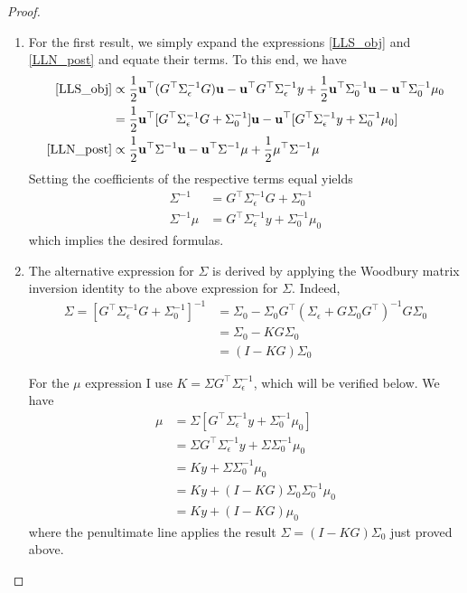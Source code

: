\documentclass[12pt]{article}
\newcommand{\bpar}{\mathbf{u}} %
\begin{document}
\begin{proof} 
\begin{enumerate}
\item For the first result, we simply expand the expressions \ref{LLS_obj} and \ref{LLN_post} and equate their terms. To this end, we have
\begin{align*}
\ref{LLS_obj} &\propto \frac{1}{2} \bpar^\top (G^\top \Sigma^{-1}_\epsilon G) \bpar - \bpar^\top G^\top \Sigma_\epsilon^{-1} y + \frac{1}{2} \bpar^\top \Sigma_0^{-1} \bpar - \bpar^\top \Sigma_0^{-1} \mu_0 \\
	             &= \frac{1}{2} \bpar^\top [G^\top \Sigma_\epsilon^{-1} G + \Sigma_0^{-1}]\bpar - \bpar^\top [G^\top \Sigma_{\epsilon}^{-1}y + \Sigma_0^{-1}\mu_0] \\
\ref{LLN_post} &\propto \frac{1}{2} \bpar^\top \Sigma^{-1} \bpar - \bpar^\top \Sigma^{-1} \mu + \frac{1}{2} \mu^\top \Sigma^{-1} \mu 	           
\end{align*}
Setting the coefficients of the respective terms equal yields
\begin{align*}
\Sigma^{-1} &= G^\top \Sigma_{\epsilon}^{-1}G + \Sigma_0^{-1} \\
\Sigma^{-1} \mu &= G^\top \Sigma_{\epsilon}^{-1}y + \Sigma_0^{-1} \mu_0
\end{align*}
which implies the desired formulas. 

\item The alternative expression for $\Sigma$ is derived by applying the Woodbury matrix inversion identity to the above expression for $\Sigma$. Indeed, 
\begin{align*}
\Sigma = \left[G^\top \Sigma_{\epsilon}^{-1}G + \Sigma_0^{-1} \right]^{-1} &= \Sigma_0 - \Sigma_0 G^\top (\Sigma_\epsilon + G \Sigma_0 G^\top)^{-1} G\Sigma_0 \\
													       &= \Sigma_0 - KG\Sigma_0 \\
													       &= (I - KG) \Sigma_0 
\end{align*}

For the $\mu$ expression I use $K = \Sigma G^\top \Sigma_{\epsilon}^{-1}$, which will be verified below. We have 
\begin{align*}
\mu &= \Sigma\left[G^\top \Sigma_{\epsilon}^{-1}y + \Sigma_0^{-1} \mu_0\right] \\
       &= \Sigma G^\top \Sigma_{\epsilon}^{-1}y + \Sigma \Sigma_0^{-1} \mu_0 \\
       &= Ky + \Sigma \Sigma_0^{-1} \mu_0 \\
       &= Ky + (I - KG)\Sigma_0  \Sigma_0^{-1} \mu_0 \\
       &= Ky + (I - KG)\mu_0
\end{align*}
where the penultimate line applies the result $\Sigma = (I - KG)\Sigma_0$ just proved above. 


\end{enumerate}
\end{proof}
\end{document}
